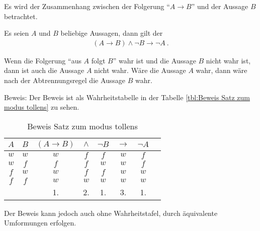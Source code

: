 \begin{Unit}
Es wird der Zusammenhang zwischen der Folgerung \enquote{$A \rightarrow B$} 
und der Aussage $B$ betrachtet.

\begin{Satz} Es seien $A$ und $B$ beliebige Aussagen, dann gilt der 
\begin{align}
  (A \rightarrow B) \land \neg B \rightarrow \neg A \ .
\end{align}
\end{Satz}

Wenn die Folgerung \enquote{aus $A$ folgt $B$} wahr ist und die Aussage $B$ 
nicht wahr ist, dann ist auch die Aussage $A$ nicht wahr. Wäre die Aussage 
$A$ wahr, dann wäre nach der Abtrennungsregel die Aussage $B$ wahr.

Beweis: 
Der Beweis ist als Wahrheitstabelle in der Tabelle \ref{tbl:Beweis Satz zum
modus tollens} zu sehen.

\begin{table}[htbp]
\begin{center}
\begin{tabular}{c|c||c|c|c|c|c|c}
  $A$ &   $B$ & $(A \rightarrow B)$ & $\land$ & $\neg B$ & $\rightarrow$ 
    & $\neg A$ \\ \hline
  $w$ &   $w$ & $w$   &   $f$  & $f$  & $w$  &  $f$  \\
  $w$ &   $f$ & $f$   &   $f$  & $w$  & $w$  &  $f$  \\
  $f$ &   $w$ & $w$   &   $f$  & $f$  & $w$  &  $w$  \\
  $f$ &   $f$ & $w$   &   $w$  & $w$  & $w$  &  $w$  \\  \hline
    &   &   1.  & 2. & 1. & 3. & 1. \\
\end{tabular}
\caption{Beweis Satz zum modus tollens}
\label{tbl:Beweis Satz zum modus tollens}
\end{center}
\end{table} 

Der Beweis kann jedoch auch ohne Wahrheitstafel, durch äquivalente 
Umformungen erfolgen.


\end{Unit}

